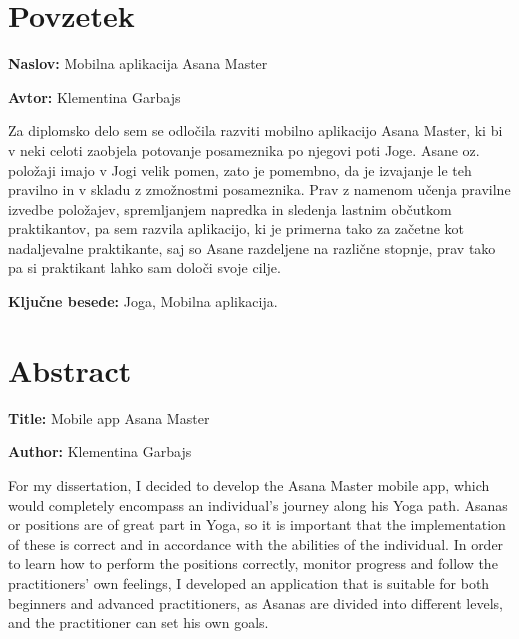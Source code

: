 \documentclass[a4paper, 12pt]{book}
\newcommand{\ttitle}{Mobilna aplikacija Asana Master}
\newcommand{\ttitleEn}{Mobile app Asana Master}
\newcommand{\tauthor}{Klementina Garbajs}
\newcommand{\tkeywords}{Joga, Mobilna aplikacija}
\newcommand{\clearemptydoublepage}{\newpage{\pagestyle{empty}\cleardoublepage}}
\begin{document}
\clearemptydoublepage

\chapter*{Povzetek}

\noindent\textbf{Naslov:} \ttitle
\bigskip

\noindent\textbf{Avtor:} \tauthor
\bigskip

\noindent 
Za diplomsko delo sem se odločila razviti mobilno aplikacijo Asana Master, ki bi v neki celoti zaobjela potovanje posameznika po njegovi poti Joge. Asane oz. položaji imajo v Jogi velik pomen, zato je pomembno, da je izvajanje le teh pravilno in v skladu z zmožnostmi posameznika. Prav z namenom učenja pravilne izvedbe položajev, spremljanjem napredka in sledenja lastnim občutkom praktikantov, pa sem razvila aplikacijo, ki je primerna tako za začetne kot nadaljevalne praktikante, saj so Asane razdeljene na različne stopnje, prav tako pa si praktikant lahko sam določi svoje cilje. 

\bigskip

\noindent\textbf{Ključne besede:} \tkeywords.
\clearemptydoublepage

\chapter*{Abstract}

\noindent\textbf{Title:} \ttitleEn
\bigskip

\noindent\textbf{Author:} \tauthor
\bigskip

\noindent 
For my dissertation, I decided to develop the Asana Master mobile app, which would completely encompass an individual's journey along his Yoga path. Asanas or positions are of great part in Yoga, so it is important that the implementation of these is correct and in accordance with the abilities of the individual. In order to learn how to perform the positions correctly, monitor progress and follow the practitioners' own feelings, I developed an application that is suitable for both beginners and advanced practitioners, as Asanas are divided into different levels, and the practitioner can set his own goals.
\bigskip
\end{document}
